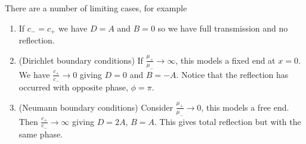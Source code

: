 There are a number of limiting cases, for example
\begin{enumerate}
	\item If $c_- = c_+$ we have $D = A$ and $B = 0$ so we have full transmission and no reflection.
	\item (Dirichlet boundary conditions) If $\frac{\mu_+}{\mu_-} \to \infty$, this models a fixed end at $x = 0$.
	      We have $\frac{c_+}{c_-} \to 0$ giving $D = 0$ and $B = -A$.
	      Notice that the reflection has occurred with opposite phase, $\phi = \pi$.
	\item (Neumann boundary conditions) Consider $\frac{\mu_+}{\mu_-} \to 0$, this models a free end.
	      Then $\frac{c_+}{c_-} \to \infty$ giving $D = 2A$, $B = A$.
	      This gives total reflection but with the same phase.
\end{enumerate}


